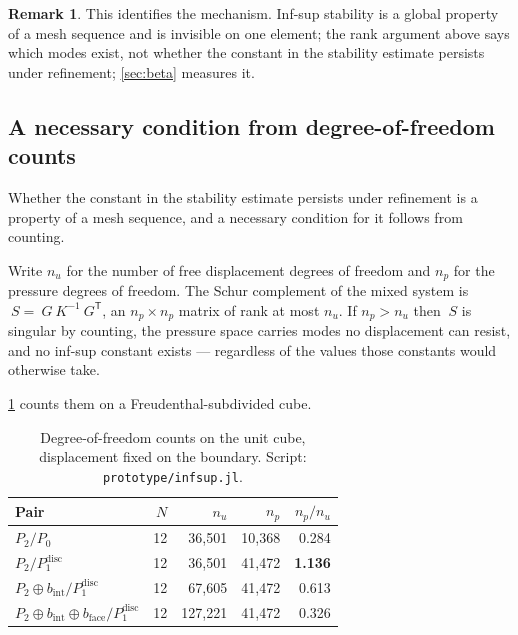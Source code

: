\documentclass{article}
\newcommand{\transpose}[1]{#1^{\mathsf{T}}}
\newcommand{\code}[1]{\texttt{#1}}
\theoremstyle{definition}
\newtheorem{remark}{Remark}
\theoremstyle{plain}
\begin{document}
\begin{remark}
This identifies the mechanism. Inf-sup stability is a
global property of a mesh sequence and is invisible on one element; the rank
argument above says which modes exist, not whether the constant in the stability
estimate persists under refinement; \cref{sec:beta} measures it.
\end{remark}

\subsection{A necessary condition from degree-of-freedom counts}
\label{sec:infsup}

Whether the constant in the stability estimate persists under refinement is a
property of a mesh sequence, and a necessary condition for it follows from
counting.

Write $n_u$ for the number of free displacement degrees of freedom and $n_p$
for the pressure degrees of freedom. The Schur complement of the mixed system
is $~S = ~G ~K^{-1} \transpose{~G}$, an $n_p \times n_p$ matrix of rank at most
$n_u$. If $n_p > n_u$ then $~S$ is singular by counting, the pressure
space carries modes no displacement can resist, and no inf-sup constant exists
--- regardless of the values those constants would otherwise take.

\cref{tab:dofcount} counts them on a Freudenthal-subdivided cube.

\begin{table}[h]
\centering
\begin{tabular}{@{}lrrrr@{}}
\toprule
Pair & $N$ & $n_u$ & $n_p$ & $n_p/n_u$ \\
\midrule
$P_2/P_0$                              & 12 & 36{,}501 & 10{,}368 & 0.284 \\
$P_2/P_1^{\mathrm{disc}}$              & 12 & 36{,}501 & 41{,}472 & \textbf{1.136} \\
$P_2 \oplus b_{\mathrm{int}} / P_1^{\mathrm{disc}}$ & 12 & 67{,}605 & 41{,}472 & 0.613 \\
$P_2 \oplus b_{\mathrm{int}} \oplus b_{\mathrm{face}} / P_1^{\mathrm{disc}}$
                                       & 12 & 127{,}221 & 41{,}472 & 0.326 \\
\bottomrule
\end{tabular}
\caption{Degree-of-freedom counts on the unit cube, displacement fixed on the
boundary. Script: \code{prototype/infsup.jl}.}
\label{tab:dofcount}
\end{table}
\end{document}
